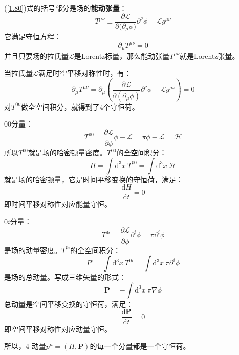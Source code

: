 \documentclass{book}
\begin{document}
(\ref{1.80})式的括号部分是场的\textbf{能动张量}：
\begin{equation}
	T^{\mu\nu}\equiv\frac{\partial\mathscr{L}}{\partial\big(\partial_\mu\phi\big)}\partial^\nu\phi-\mathscr{L}g^{\mu\nu}
\end{equation}
它满足守恒方程：
\begin{equation}
	\partial_\mu T^{\mu\nu}=0
\end{equation}
并且只要场的拉氏量$\mathscr{L}$是Lorentz标量，那么能动张量$T^{\mu\nu}$就是Lorentz张量。

当拉氏量$\mathscr{L}$满足时空平移对称性时，有：
\begin{equation}
	\partial_\mu T^{\mu\nu}=\partial_\mu \left(\frac{\partial\mathscr{L}}{\partial(\partial_\mu\phi)}\partial^\nu\phi-\mathscr{L}g^{\mu\nu}\right)=0
\end{equation}
对$T^{0\nu}$做全空间积分，就得到了$4$个守恒荷。

$00$分量：
\begin{equation}
	T^{00}=\frac{\partial\mathscr{L}}{\partial \dot{\phi}}\dot{\phi}-\mathscr{L}=\pi\dot{\phi}-\mathscr{L}=\mathscr{H}
\end{equation}
所以$T^{00}$就是场的哈密顿量密度。$T^{00}$的全空间积分：
\begin{equation}
	H=\int\mathrm{d}^3 x\ T^{00}=\int\mathrm{d}^3 x \ \mathscr{H}
\end{equation}
就是场的哈密顿量，它是时间平移变换的守恒荷，满足：
\begin{equation}
	\frac{\mathrm{d}H}{\mathrm{d}t}=0
\end{equation}
即时间平移对称性对应能量守恒。

${0i}$分量：
\begin{equation}
	T^{0i}=\frac{\partial\mathscr{L}}{\partial\dot{\phi}}\partial^i\phi=\pi\partial^i\phi
\end{equation}
是场的动量密度。$T^{0i}$的全空间积分：
\begin{equation}
	P^i=\int\mathrm{d}^3 x\ T^{0i}=\int\mathrm{d}^3 x\ \pi\partial^i\phi
\end{equation}
是场的总动量。写成三维矢量的形式：
\begin{equation}
	\mathbf{P}=-\int\mathrm{d}^3 x\ \pi\nabla\phi
\end{equation}
总动量是空间平移变换的守恒荷，满足：
\begin{equation}
	\frac{\mathrm{d}\mathbf{P}}{\mathrm{d}t}=0
\end{equation}
即空间平移对称性对应动量守恒。

所以，4-动量$p^\mu=(H,\mathbf{P})$的每一个分量都是一个守恒荷。
\end{document}
